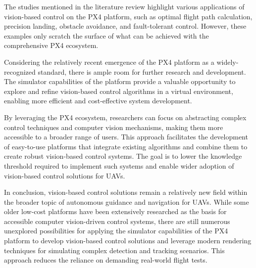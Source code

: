 The studies mentioned in the literature review highlight various applications of vision-based control on the PX4 platform, such as optimal flight path calculation, precision landing, obstacle avoidance, and fault-tolerant control. However, these examples only scratch the surface of what can be achieved with the comprehensive PX4 ecosystem.

Considering the relatively recent emergence of the PX4 platform as a widely-recognized standard, there is ample room for further research and development. The simulator capabilities of the platform provide a valuable opportunity to explore and refine vision-based control algorithms in a virtual environment, enabling more efficient and cost-effective system development.

By leveraging the PX4 ecosystem, researchers can focus on abstracting complex control techniques and computer vision mechanisms, making them more accessible to a broader range of users. This approach facilitates the development of easy-to-use platforms that integrate existing algorithms and combine them to create robust vision-based control systems. The goal is to lower the knowledge threshold required to implement such systems and enable wider adoption of vision-based control solutions for UAVs.


In conclusion, vision-based control solutions remain a relatively new field within the broader topic of autonomous guidance and navigation for UAVs. While some older low-cost platforms have been extensively researched as the basis for accessible computer vision-driven control systems, there are still numerous unexplored possibilities for applying the simulator capabilities of the PX4 platform to develop vision-based control solutions and leverage modern rendering techniques for simulating complex detection and tracking scenarios. This approach reduces the reliance on demanding real-world flight tests.